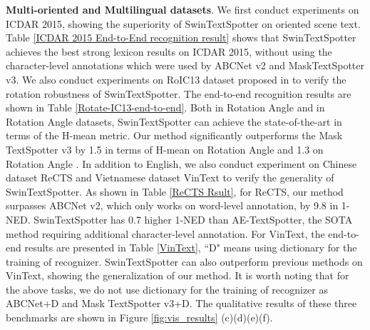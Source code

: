 \documentclass[10pt,twocolumn,letterpaper]{article}
\begin{document}
\textbf{Multi-oriented and Multilingual datasets}. We first conduct experiments on ICDAR 2015, showing the superiority of SwinTextSpotter on oriented scene text. Table \ref{ICDAR 2015 End-to-End recognition result} shows that SwinTextSpotter achieves the best strong lexicon results on ICDAR 2015, without using the character-level annotations which were used by ABCNet v2 and MaskTextSpotter v3. We also conduct experiments on RoIC13 dataset proposed in \cite{liao2020mask} to verify the rotation robustness of SwinTextSpotter. The end-to-end recognition results are shown in Table \ref{Rotate-IC13-end-to-end}. Both in Rotation Angle  and in Rotation Angle  datasets, SwinTextSpotter can achieve the state-of-the-art in terms of the H-mean metric. Our method significantly outperforms the Mask TextSpotter v3 by 1.5 in terms of  
H-mean on Rotation Angle  and 1.3  on Rotation Angle . In addition to English, we also conduct experiment on Chinese dataset ReCTS and Vietnamese dataset VinText to verify the generality of SwinTextSpotter. As shown in Table \ref{ReCTS Rsult}, for ReCTS, our method surpasses ABCNet v2, which only works on word-level annotation, by 9.8 in 1-NED.
SwinTextSpotter has 0.7 higher 1-NED than AE-TextSpotter, the SOTA method requiring additional character-level annotation. 
For VinText, the end-to-end results are presented in Table \ref{VinText}, ``D" means using dictionary for the training of recognizer. SwinTextSpotter can also outperform previous methods on VinText, showing the generalization of our method.
It is worth noting that for the above tasks, we do not use dictionary for the training of recognizer as ABCNet+D and Mask TextSpotter v3+D.
The qualitative results of these three benchmarks are shown in Figure \ref{fig:vis_results} (c)(d)(e)(f). 
\end{document}
